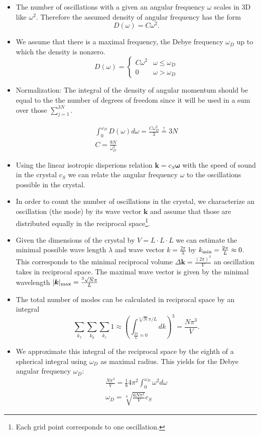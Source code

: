 \documentclass[12pt,a4paper]{article} %
\begin{document}
  \begin{itemize}
   \item The number of oscillations with a given an angular frequency $\omega$ scales in 3D like $\omega^2$. Therefore the assumed density of angular frequency has the form $$D(\omega) = C \omega^2.$$
   
   \item We assume that there is a maximal frequency, the Debye frequency $\omega_D$ up to which the density is nonzero.
   $$ D(\omega) =  \begin{cases} C \omega^2 & \omega \leq \omega_D \\
                    0 & \omega > \omega_D
                   \end{cases}$$
    \item Normalization: The integral of the density of angular momentum should be equal to the the number of degrees of freedom since it will be used in a sum over those $\sum_{j=1}^{3N}$.

    \begin{align*}
    \int_0^{\omega_D} D(\omega) d\omega = \frac{C\omega_D^3}{3} \overset{!}{=}  3N \\
    C = \frac{9N}{\omega_D^3}
    \end{align*}
    \item Using the linear isotropic disperions relation $\boldsymbol{k} = c_S \boldsymbol{\omega}$ with the speed of sound in the crystal $c_S$ we can relate the angular frequency $\omega$ to the oscillations possible in the crystal. 
   \item In order to count the number of oscillations in the crystal, we characterize an oscillation (the mode) by its wave vector $\boldsymbol{k}$ and assume that those are distributed equally in the reciprocal space\footnote{Each grid point corresponds to one oscillation.}. 
   \item Given the dimensions of the crystal by $V = L \cdot L \cdot L$ we can estimate the minimal possible wave length $\lambda$ and wave vector $k = \frac{2\pi}{\lambda}$ by $k_{\textnormal{min}} = \frac{2\pi }{L}\approx 0$. This corresponds to the minimal reciprocal volume $\Delta \boldsymbol{k} = \frac{(2\pi)^3}{V}$ an oscillation takes in reciprocal space. The maximal wave vector is given by the minimal wavelength $|\boldsymbol{k}|_\textnormal{max} = \frac{^3\sqrt{N}\pi }{L }$ 
   \item The total number of modes can be calculated in reciprocal space by an integral 
   $$\sum_{k_x} \sum_{k_y} \sum_{k_z} 1\approx \left(\int_{\frac{2\pi}{L} \approx 0}^{\sqrt[3]{N} \pi/L} dk\right)^3 = \frac{N \pi^3}{V}.$$
  
  
 \item We approximate this integral of the reciprocal space by the eighth of a spherical integral using $\omega_D$ as maximal radius. This yields for the Debye angular frequency $\omega_D$:
 \begin{align*}
 \frac{N\pi^3}{V} = \frac{1}{8} 4 \pi^2 \int_0^{\omega_D} \omega^2 d\omega \\
 \omega_D = \sqrt[3]{\frac{6N \pi^2}{V}} c_S
 \end{align*}
 
\end{itemize}   
\end{document}
